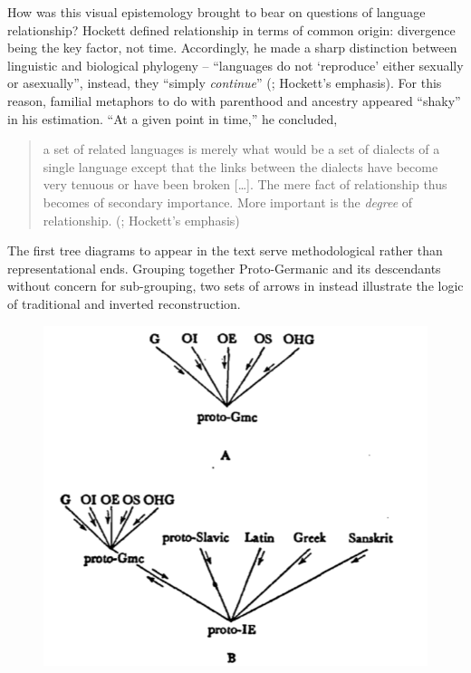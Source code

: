 \documentclass[output=paper]{langscibook}
\begin{document}
How was this visual epistemology brought to bear on questions of language relationship? Hockett defined relationship in terms of common origin: divergence being the key factor, not time. Accordingly, he made a sharp distinction between linguistic and biological phylogeny -- ``languages do not `reproduce' either sexually or asexually'', instead, they ``simply \emph{continue}'' (\citealt[369]{Hockett19591958}; Hockett's emphasis). For this reason, familial metaphors to do with parenthood and ancestry appeared ``shaky'' in his estimation. ``At a given point in time,'' he concluded,

\begin{quotation}
a set of related languages is merely what would be a set of dialects of a single language except that the links between the dialects have become very tenuous or have been broken […]. The mere fact of relationship thus becomes of secondary importance. More important is the \emph{degree} of relationship. (\citealt[369]{Hockett19591958}; Hockett's emphasis)
\end{quotation}

The first tree diagrams to appear in the text serve methodological rather than representational ends. Grouping together Proto-Germanic and its descendants without concern for sub-grouping, two sets of arrows in  instead illustrate the logic of traditional and inverted reconstruction.

\begin{figure}
    \centering
    \includegraphics[scale=1]{figures/hockett1958-514.png}
    \caption{\citet[514]{Hockett19591958}}
    \label{fig:kaplan:hockett1959514}
\end{figure}
\end{document}
